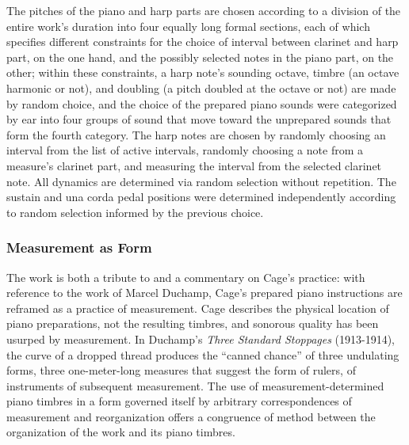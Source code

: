 The pitches of the piano and harp parts are chosen according to a division of the entire work's duration into four equally long formal sections, each of which specifies different constraints for the choice of interval between clarinet and harp part, on the one hand, and the possibly selected notes in the piano part, on the other; within these constraints, a harp note's sounding octave, timbre (an octave harmonic or not), and doubling (a pitch doubled at the octave or not) are made by random choice, and the choice of the prepared piano sounds were categorized by ear into four groups of sound that move toward the unprepared sounds that form the fourth category. The harp notes are chosen by randomly choosing an interval from the list of active intervals, randomly choosing a note from a measure's clarinet part, and measuring the interval from the selected clarinet note. All dynamics are determined via random selection without repetition. The sustain and una corda pedal positions were determined independently according to random selection informed by the previous choice.

\subsubsection{Measurement as Form}
The work is both a tribute to and a commentary on Cage's practice: with reference to the work of Marcel Duchamp, Cage's prepared piano instructions are reframed as a practice of measurement. Cage describes the physical location of piano preparations, not the resulting timbres, and sonorous quality has been usurped by measurement. In Duchamp's \emph{Three Standard Stoppages} (1913-1914), the curve of a dropped thread produces the ``canned chance'' of three undulating forms, three one-meter-long measures that suggest the form of rulers, of instruments of subsequent measurement. The use of measurement-determined piano timbres in a form governed itself by arbitrary correspondences of measurement and reorganization offers a congruence of method between the organization of the work and its piano timbres.


